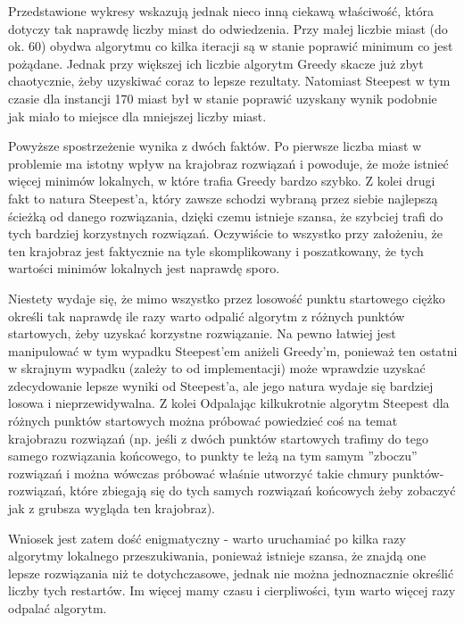Przedstawione wykresy wskazują jednak nieco inną ciekawą właściwość, która dotyczy tak naprawdę liczby miast do odwiedzenia. Przy małej liczbie miast (do ok. 60) obydwa algorytmu co kilka iteracji są w stanie poprawić minimum co jest pożądane. Jednak przy większej ich liczbie algorytm Greedy skacze już zbyt chaotycznie, żeby uzyskiwać coraz to lepsze rezultaty. Natomiast Steepest w tym czasie dla instancji 170 miast był w stanie poprawić uzyskany wynik podobnie jak miało to miejsce dla mniejszej liczby miast.

Powyższe spostrzeżenie wynika z dwóch faktów. Po pierwsze liczba miast w problemie ma istotny wpływ na krajobraz rozwiązań i powoduje, że może istnieć więcej minimów lokalnych, w które trafia Greedy bardzo szybko. Z kolei drugi fakt to natura Steepest'a, który zawsze schodzi wybraną przez siebie najlepszą ścieżką od danego rozwiązania, dzięki czemu istnieje szansa, że szybciej trafi do tych bardziej korzystnych rozwiązań. Oczywiście to wszystko przy założeniu, że ten krajobraz jest faktycznie na tyle skomplikowany i poszatkowany, że tych wartości minimów lokalnych jest naprawdę sporo.

Niestety wydaje się, że mimo wszystko przez losowość punktu startowego ciężko określi tak naprawdę ile razy warto odpalić algorytm z różnych punktów startowych, żeby uzyskać korzystne rozwiązanie. Na pewno łatwiej jest manipulować w tym wypadku Steepest'em aniżeli Greedy'm, ponieważ ten ostatni w skrajnym wypadku (zależy to od implementacji) może wprawdzie uzyskać zdecydowanie lepsze wyniki od Steepest'a, ale jego natura wydaje się bardziej losowa i nieprzewidywalna. Z kolei Odpalając kilkukrotnie algorytm Steepest dla różnych punktów startowych można próbować powiedzieć coś na temat krajobrazu rozwiązań (np. jeśli z dwóch punktów startowych trafimy do tego samego rozwiązania końcowego, to punkty te leżą na tym samym ''zboczu'' rozwiązań i można wówczas próbować właśnie utworzyć takie chmury punktów-rozwiązań, które zbiegają się do tych samych rozwiązań końcowych żeby zobaczyć jak z grubsza wygląda ten krajobraz).

Wniosek jest zatem dość enigmatyczny - warto uruchamiać po kilka razy algorytmy lokalnego przeszukiwania, ponieważ istnieje szansa, że znajdą one lepsze rozwiązania niż te dotychczasowe, jednak nie można jednoznacznie określić liczby tych restartów. Im więcej mamy czasu i cierpliwości, tym warto więcej razy odpalać algorytm.